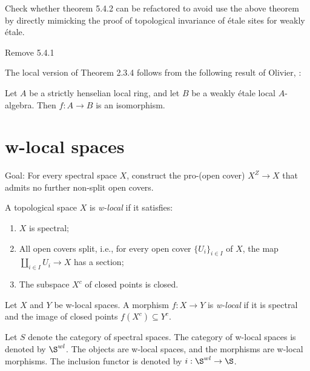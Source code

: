 Check whether theorem 5.4.2 can be refactored to avoid use the above theorem by directly mimicking the proof of topological invariance of étale sites for weakly étale.

Remove 5.4.1



The local version of Theorem 2.3.4 follows from the following result of Olivier, \cite{Oli72}:

\begin{theorem}
Let $A$ be a strictly henselian local ring, and let $B$ be a weakly étale local $A$-algebra. Then $f: A \to B$ is an isomorphism.
    \label{thm:weakly-etale-local}
\end{theorem}


\section{w-local spaces}

Goal: For every spectral space \(X\), construct the pro-(open cover) \(X^Z \to X\) that admits no further non-split open covers.

\begin{definition}
    \label{def:w-local-space}
    A topological space \(X\) is \emph{w-local} if it satisfies:
    \begin{enumerate}
        \item \(X\) is spectral;
        \item All open covers split, i.e., for every open cover \(\{U_i\}_{i \in I}\) of \(X\), the map \(\coprod_{i \in I} U_i \to X\) has a section;
        \item The subspace \(X^c\) of closed points is closed.
    \end{enumerate}
\end{definition}

\begin{definition}
    Let \(X\) and \(Y\) be w-local spaces. A morphism \(f: X \to Y\) is \emph{w-local} if it is spectral and the image of closed points \(f(X^c) \subseteq Y^c\).
    \label{def:w-local-morphism}
\end{definition}

\begin{definition}
    \label{def:w-local-space-category}

    Let \(S\) denote the category of spectral spaces. The category of w-local spaces is denoted by \(\S^{wl}\). The objects are w-local spaces, and the morphisms are w-local morphisms. The inclusion functor is denoted by \(i: \S^{wl} \to \S\).
\end{definition}

